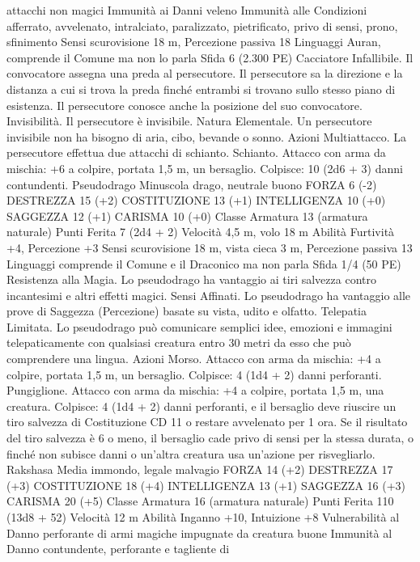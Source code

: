 \begin{multicols}{2}
attacchi non magici
Immunità ai Danni veleno
Immunità alle Condizioni afferrato, avvelenato, intralciato,
paralizzato, pietrificato, privo di sensi, prono, sfinimento
Sensi scurovisione 18 m, Percezione passiva 18
Linguaggi Auran, comprende il Comune ma non lo parla
Sfida 6 (2.300 PE)
Cacciatore Infallibile. Il convocatore assegna una preda al
persecutore. Il persecutore sa la direzione e la distanza a cui si
trova la preda finché entrambi si trovano sullo stesso piano di
esistenza. Il persecutore conosce anche la posizione del suo
convocatore.
Invisibilità. Il persecutore è invisibile.
Natura Elementale. Un persecutore invisibile non ha bisogno di
aria, cibo, bevande o sonno.
Azioni
Multiattacco. La persecutore effettua due attacchi di schianto.
Schianto. Attacco con arma da mischia: +6 a colpire, portata 1,5
m, un bersaglio.
Colpisce: 10 (2d6 + 3) danni contundenti.
Pseudodrago
Minuscola drago, neutrale buono
FORZA 6 (-2)
DESTREZZA 15 (+2)
COSTITUZIONE 13 (+1)
INTELLIGENZA 10 (+0)
SAGGEZZA 12 (+1)
CARISMA 10 (+0)
Classe Armatura 13 (armatura naturale)
Punti Ferita 7 (2d4 + 2)
Velocità 4,5 m, volo 18 m
Abilità Furtività +4, Percezione +3
Sensi scurovisione 18 m, vista cieca 3 m, Percezione passiva 13
Linguaggi comprende il Comune e il Draconico ma non parla
Sfida 1/4 (50 PE)
Resistenza alla Magia. Lo pseudodrago ha vantaggio ai tiri
salvezza contro incantesimi e altri effetti magici.
Sensi Affinati. Lo pseudodrago ha vantaggio alle prove di
Saggezza (Percezione) basate su vista, udito e olfatto.
Telepatia Limitata. Lo pseudodrago può comunicare semplici
idee, emozioni e immagini telepaticamente con qualsiasi creatura
entro 30 metri da esso che può comprendere una lingua.
Azioni
Morso. Attacco con arma da mischia: +4 a colpire, portata 1,5
m, un bersaglio.
Colpisce: 4 (1d4 + 2) danni perforanti.
Pungiglione. Attacco con arma da mischia: +4 a colpire, portata
1,5 m, una creatura.
Colpisce: 4 (1d4 + 2) danni perforanti, e il bersaglio deve
riuscire un tiro salvezza di Costituzione CD 11 o restare
avvelenato per 1 ora. Se il risultato del tiro salvezza è 6 o meno,
il bersaglio cade privo di sensi per la stessa durata, o finché non
subisce danni o un’altra creatura usa un’azione per risvegliarlo.
Rakshasa
Media immondo, legale malvagio
FORZA 14 (+2)
DESTREZZA 17 (+3)
COSTITUZIONE 18 (+4)
INTELLIGENZA 13 (+1)
SAGGEZZA 16 (+3)
CARISMA 20 (+5)
Classe Armatura 16 (armatura naturale)
Punti Ferita 110 (13d8 + 52)
Velocità 12 m
Abilità Inganno +10, Intuizione +8
Vulnerabilità al Danno perforante di armi magiche impugnate
da creatura buone
Immunità al Danno contundente, perforante e tagliente di

\end{multicols}
